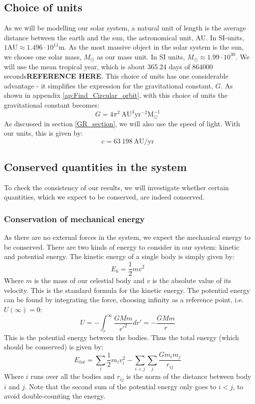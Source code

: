 \documentclass[a4paper, 10pt]{article}
\begin{document}
\subsection{Choice of units}
As we will be modelling our solar system, a natural unit of length is the average distance between the earth and the sun, the astronomical unit, AU. In SI-units, $1 \mathrm{AU} \approx 1.496 \cdot 10^{11} \mathrm{m}$. As the most massive object in the solar system is the sun, we choose one solar mass, $M_{\odot}$ as our mass unit. In SI units, $M_{\odot} \approx 1.99 \cdot 10^{30}$. We will use the mean tropical year, which is about 365.24 days of 864000 seconds\textbf{REFERENCE HERE}. This choice of units has one considerable advantage - it simplifies the expression for the gravitational constant, $G$. As shown in appendix \ref{ap:Find_Circular_orbit}, with this choice of units the gravitational constant becomes:
$$G=4\pi^2 \ \mathrm{AU^{3}yr^{-2}M_{\odot}^{-1}}$$
As discussed in section \ref{GR_section}, we will also use the speed of light. With our units, this is given by:
$$c=63\ 198 \ \mathrm{AU/yr}$$
\subsection{Conserved quantities in the system}\label{conservation_of_energy}
To check the consistency of our results, we will investigate whether certain quantities, which we expect to be conserved, are indeed conserved.
\subsubsection{Conservation of mechanical energy}
As there are no external forces in the system, we expect the mechanical energy to be conserved. There are two kinds of energy to consider in our system: kinetic and potential energy. The kinetic energy of a single body is simply given by:
$$E_{k}=\frac{1}{2}mv^2$$
Where $m$ is the mass of our celestial body and $v$ is the absolute value of its velocity. This is the standard formula for the kinetic energy. The potential energy can be found by integrating the force, choosing infinity as a reference point, i.e. $U(\infty)=0$:
$$U=-\int_r^{\infty} \frac{GMm}{r'^2} dr'=-\frac{GMm}{r}$$
This is the potential energy between the bodies. Thus the total energy (which should be conserved) is given by:
\begin{equation}\label{eq:total_energy}
E_{tot}=\sum_{i} \frac{1}{2}m_iv_i^2 - \sum_{i<j}\sum_{j}\frac{Gm_im_j}{r_{ij}}
\end{equation}
Where $i$ runs over all the bodies and $r_{ij}$ is the norm of the distance between body $i$ and $j$. Note that the second sum of the potential energy only goes to $i<j$, to avoid double-counting the energy.
\end{document}
